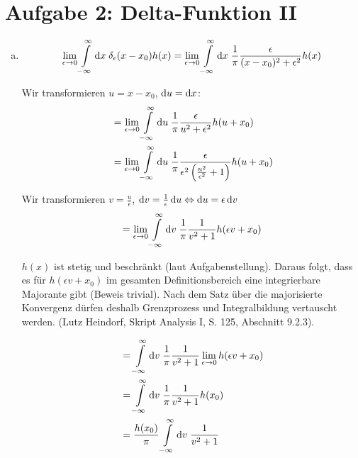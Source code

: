 \documentclass[a4paper,german,12pt,smallheadings]{scrartcl}
\begin{document}
\section*{Aufgabe 2: Delta-Funktion II}
\begin{enumerate}[a)]
  \item
    \begin{equation}
      \lim_{\epsilon \to 0} \int\limits_{-\infty}^{\infty} \dif x \; \delta_\epsilon(x - x_0) h(x)
      =
      \lim_{\epsilon \to 0} \int\limits_{-\infty}^{\infty} \dif x \; \frac{1}{\pi} \frac{\epsilon}{(x - x_0)^2 + \epsilon^2} h(x)
    \end{equation}

    Wir transformieren $u = x - x_0$, $\dif u = \dif x$:
    \begin{align}
      &= \lim_{\epsilon \to 0} \int\limits_{-\infty}^{\infty} \dif u \; \frac{1}{\pi} \frac{\epsilon}{u^2 + \epsilon^2} h(u + x_0) \\
      &= \lim_{\epsilon \to 0} \int\limits_{-\infty}^{\infty} \dif u \; \frac{1}{\pi} \frac{\epsilon}{\epsilon^2 \del{\frac{u^2}{\epsilon^2} + 1}} h(u + x_0) \\
    \end{align}

    Wir transformieren $v = \frac{u}{\epsilon}$, $\dif v = \frac{1}{\epsilon} \dif u \Leftrightarrow \dif u = \epsilon \dif v$
    \begin{equation}
      = \lim_{\epsilon \to 0} \int\limits_{-\infty}^{\infty} \dif v \; \frac{1}{\pi} \frac{1}{v^2 + 1} h(\epsilon v + x_0)
    \end{equation}

    $h(x)$ ist stetig und beschränkt (laut Aufgabenstellung). Daraus folgt,
    dass es für $h(\epsilon v + x_0)$ im gesamten Definitionsbereich eine
    integrierbare Majorante gibt (Beweis trivial). Nach dem Satz über die
    majorisierte Konvergenz dürfen deshalb Grenzprozess und Integralbildung
    vertauscht werden. (Lutz Heindorf, Skript Analysis I, S. 125, Abschnitt
    9.2.3).

    \begin{align}
      &= \int\limits_{-\infty}^{\infty} \dif v \; \frac{1}{\pi} \frac{1}{v^2 + 1} \lim_{\epsilon \to 0} h(\epsilon v + x_0) \\
      &= \int\limits_{-\infty}^{\infty} \dif v \; \frac{1}{\pi} \frac{1}{v^2 + 1} h(x_0) \\
      &= \frac{h(x_0)}{\pi} \int\limits_{-\infty}^{\infty} \dif v \; \frac{1}{v^2 + 1}
    \end{align}


\end{enumerate}
\end{document}
